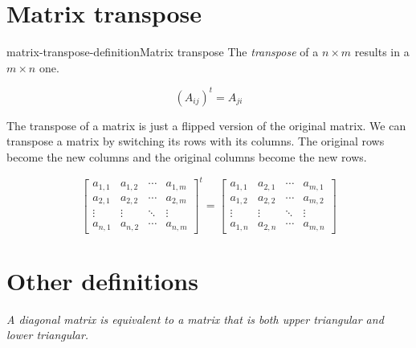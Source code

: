 \documentclass[preview]{standalone}
\begin{document}

\section{Matrix transpose}

\begin{snippetdefinition}{matrix-transpose-definition}{Matrix transpose}
    The \textit{transpose} of a \(n \times m\) \matrix results in a \(m \times n\) one.

    \[
        {\left(A_{ij}\right)}^t=A_{ji}
    \]
    
    The transpose of a matrix is just a flipped version of the original matrix.
    We can transpose a matrix by switching its rows with its columns.
    The original rows become the new columns and the original columns become the new rows.
    
    \[
        {\begin{bmatrix} 
            a_{1,1} & a_{1,2} & \cdots & a_{1,m} \\
            a_{2,1} & a_{2,2} & \cdots & a_{2,m} \\
            \vdots  & \vdots  & \ddots & \vdots  \\
            a_{n,1} & a_{n,2} & \cdots & a_{n,m} 
        \end{bmatrix}}^t
        =
        \begin{bmatrix} 
            a_{1,1} & a_{2,1} & \cdots & a_{m,1} \\
            a_{1,2} & a_{2,2} & \cdots & a_{m,2} \\
            \vdots  & \vdots  & \ddots & \vdots  \\
            a_{1,n} & a_{2,n} & \cdots & a_{m,n} 
        \end{bmatrix}
    \]
\end{snippetdefinition}

\section{Other definitions}


\textit{A diagonal matrix is equivalent to a matrix that is both upper triangular and lower triangular.}
\end{document}
